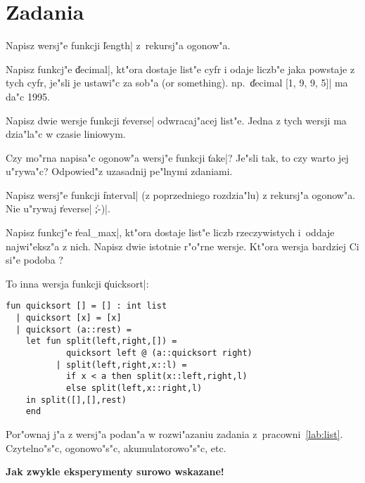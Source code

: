 \section*{Zadania}
\begin{exercises}

\item%
Napisz wersj"e funkcji \|length| z~rekursj"a ogonow"a.

\item%
Napisz funkcj"e \|decimal|, kt"ora dostaje list"e cyfr
i odaje liczb"e jaka powstaje z tych cyfr,
je"sli je ustawi"c za sob"a (or something).
np.\ \|decimal [1, 9, 9, 5]| ma da"c 1995.

\item%
Napisz dwie wersje funkcji \|reverse| odwracaj"acej list"e.
Jedna z tych wersji ma dzia"la"c w czasie liniowym.

\item%
Czy mo"rna napisa"c ogonow"a wersj"e funkcji \|take|?
Je"sli tak, to czy warto jej u"rywa"c?
Odpowied"z uzasadnij pe"lnymi zdaniami.

\item%
Napisz wersj"e funkcji \|interval| (z poprzedniego rozdzia"lu)
z rekursj"a ogonow"a. Nie u"rywaj \|reverse| \|;-)|.

\item%
Napisz funkcj"e \|real_max|, kt"ora dostaje list"e liczb rzeczywistych
i~oddaje najwi"eksz"a z nich. Napisz dwie istotnie r"o"rne wersje.
Kt"ora wersja bardziej Ci si"e podoba ?

\pagebreak

\item%
To inna wersja funkcji \|quicksort|:
\begin{verbatim}
fun quicksort [] = [] : int list
  | quicksort [x] = [x]
  | quicksort (a::rest) = 
    let fun split(left,right,[]) = 
            quicksort left @ (a::quicksort right)
          | split(left,right,x::l) =
            if x < a then split(x::left,right,l)
            else split(left,x::right,l)
    in split([],[],rest)
    end
\end{verbatim}
Por"ownaj j"a z wersj"a podan"a w rozwi"azaniu zadania z~pracowni~\ref{lab:list}.
Czytelno"s"c, ogonowo"s"c, akumulatorowo"s"c, etc.

\end{exercises}

{\bf Jak zwykle eksperymenty surowo wskazane!}

